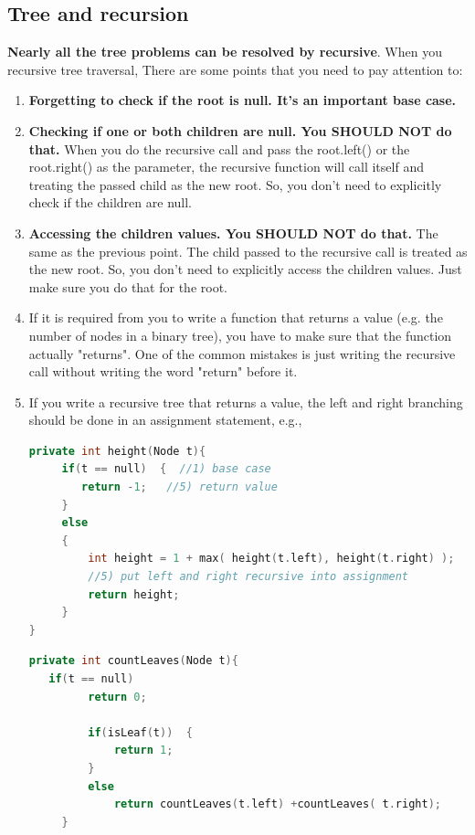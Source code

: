 \documentclass[a4paper,12pt,twoside]{book}
\begin{document}
\subsection{Tree and recursion} 
\textbf{Nearly all the tree problems can be resolved by recursive}. When you recursive tree traversal,  There are some points that you need to pay attention to:
\begin{enumerate}
\item \textbf{Forgetting to check if the root is null. It's an important base case.}

\item \textbf{Checking if one or both children are null. You SHOULD NOT do that.} When you do the recursive call and pass the root.left() or the root.right() as the parameter, the recursive function will call itself and treating the passed child as the new root. So, you don't need to explicitly check if the children are null.

\item \textbf{Accessing the children values. You SHOULD NOT do that.} The same as the previous point. The child passed to the recursive call is treated as the new root. So, you don't need to explicitly access the children values. Just make sure you do that for the root.

\item If it is required from you to write a function that returns a value (e.g. the number of nodes in a binary tree), you have to make sure that the function actually "returns". One of the common mistakes is just writing the recursive call without writing the word "return" before it.

 \item If you write a recursive tree  that returns a value, the left and right branching should be done in an assignment statement, e.g.,
\begin{lstlisting}[frame=single, language=c++]
private int height(Node t){
     if(t == null)  {  //1) base case
        return -1;   //5) return value 
     }
     else
     {
         int height = 1 + max( height(t.left), height(t.right) );
         //5) put left and right recursive into assignment
         return height;
     }
}
\end{lstlisting}

\begin{lstlisting}[frame=single, language=c++]
private int countLeaves(Node t){
   if(t == null) 
         return 0;
         
         if(isLeaf(t))  {
             return 1;
         }
         else
             return countLeaves(t.left) +countLeaves( t.right);
     }
    

\end{lstlisting}
\end{enumerate}
\end{document}
